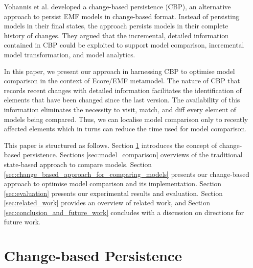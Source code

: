 \documentclass{llncs}
\begin{document}
Yohannis et al.\cite{DBLP:conf/models/YohannisKP17,yohannis2018towards,DBLP:conf/models/YohannisRPK18} developed a change-based persistence (CBP), an alternative approach to persist EMF models \cite{steinberg2008emf} in change-based format. Instead of persisting models in their final states, the approach persists models in their complete history of changes. They argued that the incremental, detailed information contained in CBP could be exploited to support model comparison, incremental model transformation, and model analytics.

In this paper, we present our approach in harnessing CBP to optimise model comparison in the context of Ecore/EMF metamodel. The nature of CBP that records recent changes with detailed information facilitates the identification of elements that have been changed since the last version. The availability of this information eliminates the necessity to visit, match, and diff every element of models being compared. Thus, we can localise model comparison only to recently affected elements which in turns can reduce the time used for model comparison.

This paper is structured as follows. Section \ref{sec:change-based_persistence} introduces the concept of change-based persistence. Sections \ref{sec:model_comparison} overviews of the traditional state-based approach to compare models. Section \ref{sec:change_based_approach_for_comparing_models} presents our change-based approach to optimise model comparison and its implementation. Section \ref{sec:evaluation} presents our experimental results and evaluation. Section \ref{sec:related_work} provides an overview of related work, and Section \ref{sec:conclusion_and_future_work} concludes with a discussion on directions for future work.

\vspace{-10pt}
\section{Change-based Persistence}
\label{sec:change-based_persistence}
\end{document}
